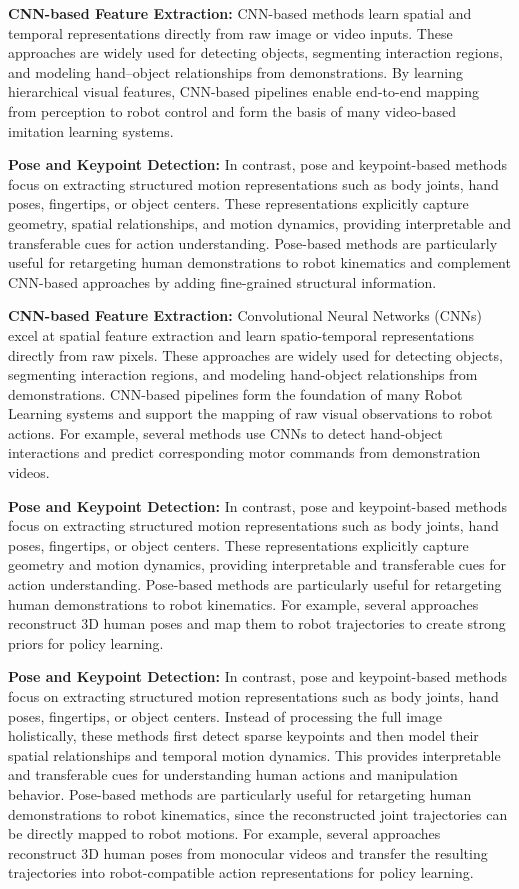 \textbf{CNN-based Feature Extraction:} CNN-based methods learn spatial and temporal representations directly from raw image or video inputs. These approaches are widely used for detecting objects, segmenting interaction regions, and modeling hand–object relationships from demonstrations. By learning hierarchical visual features, CNN-based pipelines enable end-to-end mapping from perception to robot control and form the basis of many video-based imitation learning systems.

\textbf{Pose and Keypoint Detection:} In contrast, pose and keypoint-based methods focus on extracting structured motion representations such as body joints, hand poses, fingertips, or object centers. These representations explicitly capture geometry, spatial relationships, and motion dynamics, providing interpretable and transferable cues for action understanding. Pose-based methods are particularly useful for retargeting human demonstrations to robot kinematics and complement CNN-based approaches by adding fine-grained structural information.



\textbf{CNN-based Feature Extraction:} Convolutional Neural Networks (CNNs) excel at spatial feature extraction and learn spatio-temporal representations directly from raw pixels. These approaches are widely used for detecting objects, segmenting interaction regions, and modeling hand-object relationships from demonstrations. CNN-based pipelines form the foundation of many Robot Learning systems and support the mapping of raw visual observations to robot actions. For example, several methods use CNNs to detect hand-object interactions and predict corresponding motor commands from demonstration videos.

\textbf{Pose and Keypoint Detection:} In contrast, pose and keypoint-based methods focus on extracting structured motion representations such as body joints, hand poses, fingertips, or object centers. These representations explicitly capture geometry and motion dynamics, providing interpretable and transferable cues for action understanding. Pose-based methods are particularly useful for retargeting human demonstrations to robot kinematics. For example, several approaches reconstruct 3D human poses and map them to robot trajectories to create strong priors for policy learning.


\textbf{Pose and Keypoint Detection:} In contrast, pose and keypoint-based methods focus on extracting structured motion representations such as body joints, hand poses, fingertips, or object centers. Instead of processing the full image holistically, these methods first detect sparse keypoints and then model their spatial relationships and temporal motion dynamics. This provides interpretable and transferable cues for understanding human actions and manipulation behavior. Pose-based methods are particularly useful for retargeting human demonstrations to robot kinematics, since the reconstructed joint trajectories can be directly mapped to robot motions. For example, several approaches reconstruct 3D human poses from monocular videos and transfer the resulting trajectories into robot-compatible action representations for policy learning.


